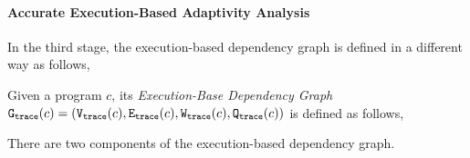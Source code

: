 \paragraph{Accurate Execution-Based Adaptivity Analysis}
\label{sec:refine-exe-adapt}
%
In the third stage, the execution-based dependency graph is defined in a different way as follows,
\begin{defn}
    \label{def:trace_graph}
    Given a program ${c}$,
    its \emph{Execution-Base Dependency Graph} 
    $\mathtt{{G_{trace}}}({c}) = (\mathtt{{V_{trace}}}({c}), \mathtt{{E_{trace}}}({c}), \mathtt{{W_{trace}}}({c}), \mathtt{{Q_{trace}}}({c}))$ is defined as follows,
    \highlight{\small
    \[
    \begin{array}{lcl}
      \traceV({c}) & := & 
      \{ 
      (x^l, w) 
      ~ \vert ~ 
      w : \mathcal{T} \to \mathbb{N}
      \land
      x^l \in \lvar(c) 
      \\ & &
      \land
      \forall \trace \in \mathcal{T}_0(c), \trace' \in \mathcal{T} \sthat \config{{c}, \trace} \to^{*} \config{\eskip, \trace\tracecat\vtrace'} 
      \implies w(\trace) = \vcounter(\vtrace', l) 
    \}
      \\
      \traceE({c}) & := & 
      \{ 
      (x^i, w, y^j) 
      ~ \vert ~
      x^i, y^j \in \lvar(c)
      \land w \in \mathcal{P}( \mathcal{T}_0(c) \to \mathbb{N})
      \land 
      \exists \trace \in \mathcal{T}_0(c), 
      \trace_1, \trace_2 \in \mathcal{T} \sthat \dep(x^i, y^j,\trace_1, \trace_2, \trace_0, c)
      \\ & &
      \land \forall \trace_0 \in \mathcal{T}_0(c) \sthat
      w (\trace_0) = \max \left\{ | \sdiff(\trace_1, \trace_2, y)|
      ~\middle\vert~
      \forall \trace_1, \trace_2 \in \mathcal{T} \sthat \dep(x^i, y^j,\trace_1, \trace_2, \trace_0, c) \right\}
      \}
    \end{array}
    \]
    }
    \end{defn}
    There are two components of the execution-based dependency graph. 
    \\
